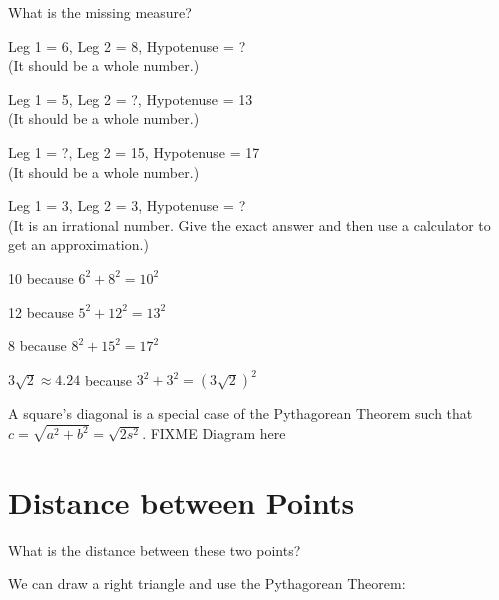 \begin{Exercise}[title={Find the Missing Length}, label=missingsides]
  What is the missing measure?
  \begin{multicols}{2}
Leg 1 = 6, Leg 2 = 8, Hypotenuse = ? \\(It should be a whole number.)

Leg 1 = 5, Leg 2 = ?, Hypotenuse = 13 \\(It should be a whole number.)
  
Leg 1 = ?, Leg 2 = 15, Hypotenuse = 17 \\(It should be a whole number.)

Leg 1 = 3, Leg 2 = 3, Hypotenuse = ? \\(It is an irrational number. Give the exact answer and then use a calculator to get an approximation.)
\end{multicols}
\end{Exercise}
\begin{Answer}[ref=missingsides]
  10 because $6^2 + 8^2 = 10^2$

  12 because $5^2 + 12^2 = 13^2$

  8 because $8^2 + 15^2 = 17^2$

  $3\sqrt{2} \approx 4.24$ because $3^2 + 3^2 = \left(3 \sqrt{2}\right)^2$
\end{Answer}

A square's diagonal is a special case of the Pythagorean Theorem such that $c =\sqrt{a^2+b^2} = \sqrt{2s^2}$. FIXME Diagram here

\section{Distance between Points}

What is the distance between these two points?


We can draw a right triangle and use the Pythagorean Theorem:

